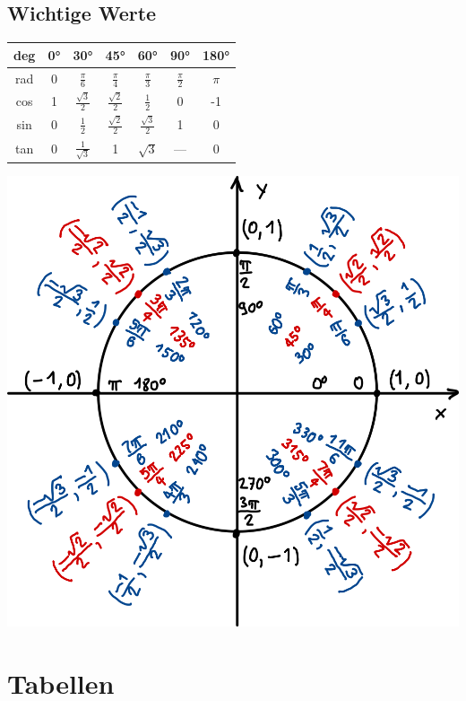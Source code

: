 \documentclass[a4paper,10pt]{article}
\begin{document}
\subsection{Wichtige Werte}
\begin{tabular}{c|cccccc}
    deg & 0° & 30° & 45° & 60° & 90° & 180° \\
    \hline
    rad & 0 & $\frac{\pi}{6}$ & $\frac{\pi}{4}$ & $\frac{\pi}{3}$ & $\frac{\pi}{2}$ & $\pi$ \\
    cos & 1 & $\frac{\sqrt{3}}{2}$ & $\frac{\sqrt{2}}{2}$ & $\frac{1}{2}$ & 0 & -1 \\
    sin & 0 & $\frac{1}{2}$ & $\frac{\sqrt{2}}{2}$ & $\frac{\sqrt{3}}{2}$ & 1 & 0 \\
    tan & 0 & $\frac{1}{\sqrt{3}}$ & 1 & $\sqrt{3}$ & --- & 0 \\
\end{tabular}

\begin{center}
\includegraphics[width=\linewidth]{Einheitskreis.png}
\end{center}

\section{Tabellen}
\small
\end{document}
